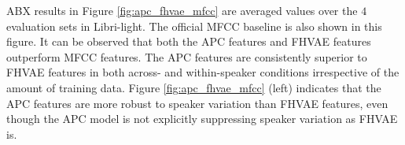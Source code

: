 \documentclass[a4paper]{article}
\begin{document}
ABX results in  Figure \ref{fig:apc_fhvae_mfcc} are averaged values over the $4$ evaluation sets in Libri-light. The official MFCC baseline   \cite{kahn2019librilight} is also shown in this figure. It can be observed that both the APC features and FHVAE features  outperform MFCC features. The APC features are consistently superior to FHVAE features in both across- and within-speaker conditions irrespective of the amount of training data.
Figure \ref{fig:apc_fhvae_mfcc} (left) indicates that the APC features are more robust to speaker variation than FHVAE features, even though the APC model is not explicitly suppressing speaker variation as FHVAE is.

\end{document}
